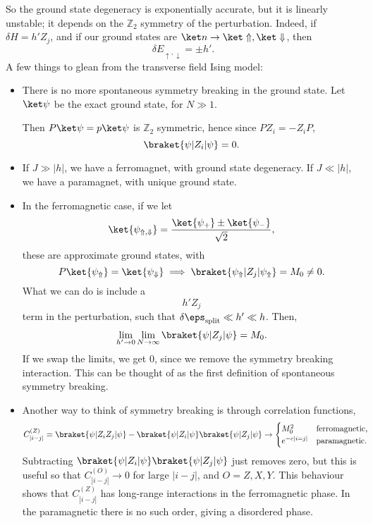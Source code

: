 \documentclass[12pt]{article}
\begin{document}
So the ground state degeneracy is exponentially accurate, but it is linearly unstable; it depends on the $\mathbb{Z}_2$ symmetry of the perturbation. Indeed, if $\delta H = h' Z_j$, and if our ground states are $\ket n \to \ket \Uparrow, \ket \Downarrow$, then
\[
\delta E_{\uparrow, \downarrow} = \pm h'.
\]
A few things to glean from the transverse field Ising model:
\begin{itemize}
	\item There is no more spontaneous symmetry breaking in the ground state. Let $\ket \psi$ be the exact ground state, for $N \gg 1$.

		Then $P \ket \psi = p \ket \psi$ is $\mathbb{Z}_2$ symmetric, hence since $P Z_i = - Z_i P$,
		\[
			\braket{\psi|Z_i|\psi} = 0.
		\]
	\item If $J \gg |h|$, we have a ferromagnet, with ground state degeneracy. If $J \ll |h|$, we have a paramagnet, with unique ground state.
	\item In the ferromagnetic case, if we let
		\[
			\ket{\psi_{\Uparrow,\Downarrow}} = \frac{\ket{\psi_+} \pm \ket{\psi_-}}{\sqrt 2},
		\]
		these are approximate ground states, with
		\[
			P\ket{\psi_{\Uparrow}} = \ket{\psi_{\Downarrow}} \implies \braket{\psi_{\Uparrow}|Z_j|\psi_{\Uparrow}} = M_0 \neq 0.
		\]
		What we can do is include a
		\[
		h' Z_j
		\]
		term in the perturbation, such that $\delta \eps_{\mathrm{split}} \ll h' \ll h$. Then,
		\[
			\lim_{h' \to 0} \lim_{N \to \infty} \braket{\psi | Z_j | \psi} = M_0.
		\]
		If we swap the limits, we get 0, since we remove the symmetry breaking interaction. This can be thought of as the first definition of spontaneous symmetry breaking.
	\item Another way to think of symmetry breaking is through correlation functions,
		\begin{align*}
			C_{|i-j|}^{(Z)} &= \braket{\psi|Z_i Z_j|\psi} - \braket{\psi|Z_i|\psi}\braket{\psi|Z_j|\psi} \to
			\begin{cases}
				M_0^2 & \text{ferromagnetic}, \\
				e^{-c|i = j|} & \text{paramagnetic}.
			\end{cases}
		\end{align*}
		Subtracting $\braket{\psi|Z_i|\psi}\braket{\psi|Z_j|\psi}$ just removes zero, but this is useful so that $C_{|i-j|}^{(O)} \to 0$ for large $|i-j|$, and $O = Z, X, Y$. This behaviour shows that $C_{|i-j|}^{(Z)}$ has long-range interactions in the ferromagnetic phase. In the paramagnetic there is no such order, giving a disordered phase.
\end{itemize}
\end{document}

